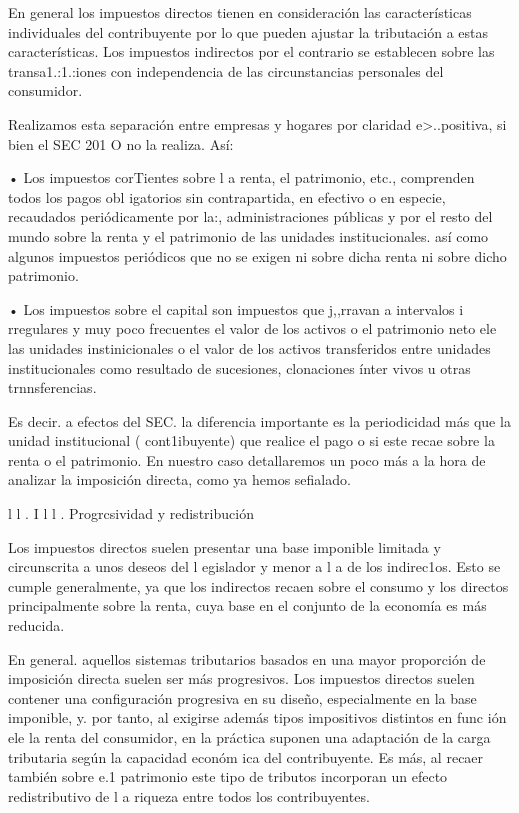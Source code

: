 \documentclass[10pt,a4paper]{article}
\begin{document}
En general los impuestos directos tienen en consideración las características individuales del contribuyente por lo que pueden ajustar la tributación a estas características. Los impuestos indirectos por el contrario se establecen sobre las transa1.:1.:iones con independencia de las circunstancias personales del consumidor.

Realizamos esta separación entre empresas y hogares por claridad e>..positiva, si bien el SEC 201 O no la realiza. Así:

• Los impuestos corTientes sobre l a renta, el patrimonio, etc., comprenden todos los pagos obl igatorios sin contrapartida, en efectivo o en especie, recaudados periódicamente por la:, administraciones públicas y por el resto del mundo sobre la renta y el patrimonio de las unidades institucionales. así como algunos impuestos periódicos que no se exigen ni sobre dicha renta ni sobre dicho patrimonio.

• Los impuestos sobre el capital son impuestos que j,,rravan a intervalos i rregulares y muy poco frecuentes el valor de los activos o el patrimonio neto ele las unidades instinicionales o el valor de los activos transferidos entre unidades institucionales como resultado de sucesiones, clonaciones ínter vivos u otras trnnsferencias.

Es decir. a efectos del SEC. la diferencia importante es la periodicidad más que la unidad institucional ( cont1ibuyente) que realice el pago o si este recae sobre la renta o el patrimonio. En nuestro caso detallaremos un poco más a la hora de analizar la imposición directa, como ya hemos sefialado.


l l . I l l . Progrcsividad y redistribución

Los impuestos directos suelen presentar una base imponible limitada y circunscrita a unos deseos del l egislador y menor a l a de los indirec1os. Esto se cumple generalmente, ya que los indirectos recaen sobre el consumo y los directos principalmente sobre la renta, cuya base en el conjunto de la economía es más reducida.

En general. aquellos sistemas tributarios basados en una mayor proporción de imposición directa suelen ser más progresivos. Los impuestos directos suelen contener una configuración progresiva en su diseño, especialmente en la base imponible, y. por tanto, al exigirse además tipos  impositivos distintos en func ión ele la renta del consumidor, en la práctica suponen una adaptación de la carga tributaria según la capacidad económ ica del contribuyente. Es más, al recaer también sobre e.1 patrimonio este tipo de tributos incorporan un efecto redistributivo de l a riqueza entre todos los contribuyentes.
\end{document}
